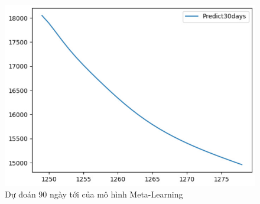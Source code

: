 \begin{figure}[H]
\begin{minipage}{0.15\textwidth}
    \includegraphics[width=1\textwidth]{resources/chapter-5/predicted/EXB_LSTM_9_1_next30days.jpg}
    \end{minipage}
    \hfill
    
    \caption{Dự đoán 90 ngày tới của mô hình Meta-Learning}
    \label{fig:lstm_predicted}
\end{figure}


